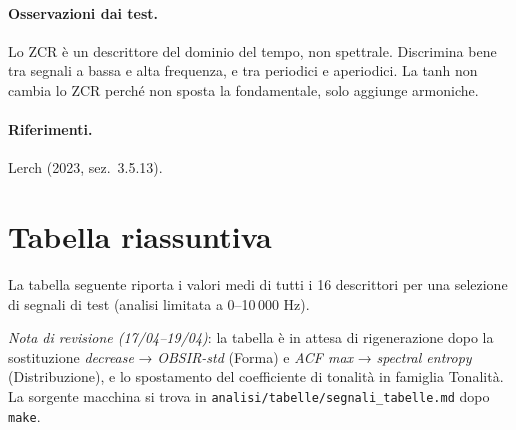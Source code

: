 \documentclass[a4paper,11pt]{article}
\newcommand{\rif}{\paragraph{Riferimenti.}}
\newcommand{\oss}{\paragraph{Osservazioni dai test.}}
\begin{document}
\oss Lo ZCR è un descrittore del dominio del tempo, non spettrale.
Discrimina bene tra segnali a bassa e alta frequenza, e tra periodici
e aperiodici. La tanh non cambia lo ZCR perché non sposta la
fondamentale, solo aggiunge armoniche.

\rif Lerch (2023, sez.~3.5.13).


\section{Tabella riassuntiva}

La tabella seguente riporta i valori medi di tutti i 16 descrittori
per una selezione di segnali di test (analisi limitata a 0--10\,000 Hz).

\noindent\textit{Nota di revisione (17/04--19/04)}: la tabella è in
attesa di rigenerazione dopo la sostituzione \emph{decrease} →
\emph{OBSIR-std} (Forma) e \emph{ACF max} → \emph{spectral entropy}
(Distribuzione), e lo spostamento del coefficiente di tonalità in
famiglia Tonalità. La sorgente macchina si trova in
\texttt{analisi/tabelle/segnali\_tabelle.md} dopo \texttt{make}.
\end{document}
